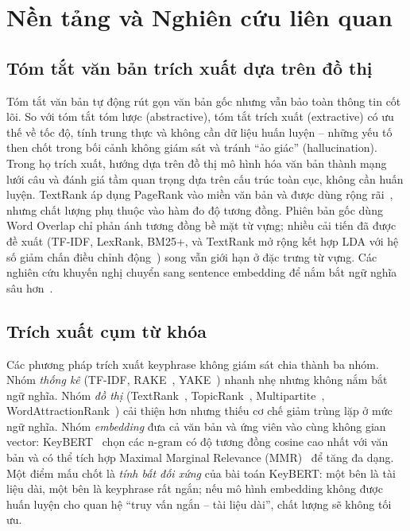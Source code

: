 \section{Nền tảng và Nghiên cứu liên quan}
\label{sec:related}

\subsection{Tóm tắt văn bản trích xuất dựa trên đồ thị}
Tóm tắt văn bản tự động rút gọn văn bản gốc nhưng vẫn bảo toàn thông tin cốt
lõi. So với tóm tắt tóm lược (abstractive), tóm tắt trích
xuất (extractive) có ưu thế về tốc độ, tính trung thực và không cần dữ liệu huấn
luyện -- những yếu tố then chốt trong bối cảnh không giám sát và tránh ``ảo
giác'' (hallucination). Trong họ
trích xuất, hướng dựa trên đồ thị mô hình hóa văn bản thành mạng lưới câu và đánh
giá tầm quan trọng dựa trên cấu trúc toàn cục, không cần huấn luyện. TextRank áp
dụng PageRank vào miền văn bản và được
dùng rộng rãi~\cite{mihalcea2004textrank}, nhưng chất lượng phụ thuộc vào hàm đo
độ tương đồng. Phiên bản gốc dùng Word Overlap chỉ phản ánh tương đồng bề mặt từ
vựng; nhiều cải tiến đã được đề xuất (TF-IDF, LexRank, BM25+, và TextRank mở
rộng kết hợp LDA với hệ số giảm chấn điều chỉnh động~\cite{vora2024extractive}) song
vẫn giới hạn ở đặc trưng từ vựng.
Các nghiên cứu khuyến nghị chuyển sang sentence embedding để nắm bắt ngữ nghĩa
sâu hơn~\cite{kadriu2021extractive}.

\subsection{Trích xuất cụm từ khóa}
Các phương pháp trích xuất keyphrase không giám sát chia thành ba
nhóm. Nhóm \emph{thống kê} (TF-IDF, RAKE~\cite{rose2010automatic},
YAKE~\cite{campos2020yake}) nhanh nhẹ nhưng không
nắm bắt ngữ nghĩa. Nhóm \emph{đồ thị} (TextRank~\cite{mihalcea2004textrank},
TopicRank~\cite{bougouin2013topicrank}, Multipartite~\cite{boudin2018unsupervised},
WordAttractionRank~\cite{wang2014corpus}) cải thiện hơn nhưng thiếu cơ chế giảm
trùng lặp ở mức ngữ nghĩa. Nhóm \emph{embedding} đưa cả văn bản và ứng viên vào
cùng không gian vector: KeyBERT~\cite{grootendorst2020keybert} chọn các n-gram có
độ tương đồng cosine cao nhất với văn bản và có thể tích hợp Maximal Marginal
Relevance (MMR)~\cite{carbonell1998use} để tăng đa dạng. Một điểm mấu chốt là
\emph{tính bất đối xứng} của bài toán KeyBERT: một bên là tài liệu dài, một bên
là keyphrase rất ngắn; nếu mô hình embedding không được huấn luyện cho quan hệ
``truy vấn ngắn -- tài liệu dài'', chất lượng sẽ không tối ưu.

